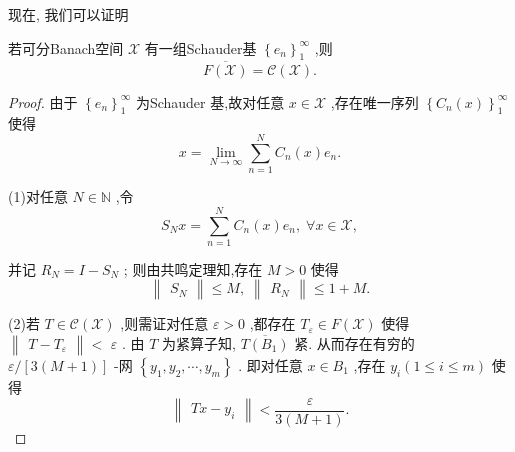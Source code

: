 \documentclass[lang=cn,newtx,10pt,scheme=chinese,thmcnt=chapter]{elegantbook}
\begin{document}
现在, 我们可以证明
\begin{theorem}
     若可分Banach空间 \(\mathcal{X}\) 有一组Schauder基 \({\left\{  {e}_{n}\right\}  }_{1}^{\infty }\) ,则
\begin{equation*}
\overline{F\left( \mathcal{X}\right) } = \mathcal{C}\left( \mathcal{X}\right) .
\end{equation*}
\end{theorem}
\begin{proof}
    由于 \({\left\{  {e}_{n}\right\}  }_{1}^{\infty }\) 为Schauder 基,故对任意 \(x \in  \mathcal{X}\) ,存在唯一序列 \({\left\{  {C}_{n}\left( x\right) \right\}  }_{1}^{\infty }\) 使得
\begin{equation*}
x = \mathop{\lim }\limits_{{N \rightarrow  \infty }}\mathop{\sum }\limits_{{n = 1}}^{N}{C}_{n}\left( x\right) {e}_{n}.
\end{equation*}

(1)对任意 \(N \in  \mathbb{N}\) ,令
\begin{equation*}
{S}_{N}x = \mathop{\sum }\limits_{{n = 1}}^{N}{C}_{n}\left( x\right) {e}_{n},\;\forall x \in  \mathcal{X},
\end{equation*}

并记 \({R}_{N} = I - {S}_{N}\) ; 则由共鸣定理知,存在 \(M > 0\) 使得
\begin{equation*}
\begin{Vmatrix}{S}_{N}\end{Vmatrix} \leqslant  M,\;\begin{Vmatrix}{R}_{N}\end{Vmatrix} \leqslant  1 + M.
\end{equation*}

(2)若 \(T \in  \mathcal{C}\left( \mathcal{X}\right)\) ,则需证对任意 \(\varepsilon  > 0\) ,都存在 \({T}_{\varepsilon } \in  F\left( \mathcal{X}\right)\) 使得 \(\begin{Vmatrix}{T - {T}_{\varepsilon }}\end{Vmatrix} <\)  \(\varepsilon\) . 由 \(T\) 为紧算子知, \(\overline{T\left( {B}_{1}\right) }\) 紧. 从而存在有穷的 \(\varepsilon /\left\lbrack  {3\left( {M + 1}\right) }\right\rbrack\) -网 \(\left\{  {{y}_{1},{y}_{2},\cdots ,{y}_{m}}\right\}\) . 即对任意 \(x \in  {B}_{1}\) ,存在 \({y}_{i}\left( {1 \leqslant  i \leqslant  m}\right)\) 使得
\begin{equation*}
\begin{Vmatrix}{{Tx} - {y}_{i}}\end{Vmatrix} < \frac{\varepsilon }{3\left( {M + 1}\right) }.
\end{equation*}


\end{proof}
\end{document}
